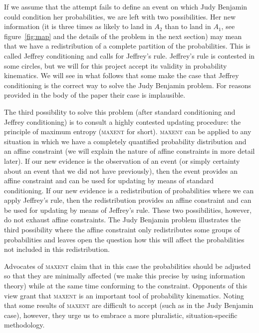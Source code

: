 \documentclass[smallextended]{svjour3}       %
\begin{document}
If we assume that the attempt fails to define an event on which Judy
Benjamin could condition her probabilities, we are left with two
possibilities. Her new information (it is three times as likely to
land in $A_{2}$ than to land in $A_{1}$, see figure~\ref{fig:map} and
the details of the problem in the next section) may mean that we have
a redistribution of a complete partition of the probabilities. This is
called Jeffrey conditioning and calls for Jeffrey's rule. Jeffrey's
rule is contested in some circles, but we will for this project accept
its validity in probability kinematics. We will see in what follows
that some make the case that Jeffrey conditioning is the correct way
to solve the Judy Benjamin problem. For reasons provided in the body
of the paper their case is implausible.

The third possibility to solve this problem (after standard
conditioning and Jeffrey conditioning) is to consult a highly
contested updating procedure: the principle of maximum entropy
(\textsc{maxent} for short). \textsc{maxent} can be applied to any
situation in which we have a completely quantified probability
distribution and an affine constraint (we will explain the nature of
affine constraints in more detail later). If our new evidence is the
observation of an event (or simply certainty about an event that we
did not have previously), then the event provides an affine constraint
and can be used for updating by means of standard conditioning. If our
new evidence is a redistribution of probabilities where we can apply
Jeffrey's rule, then the redistribution provides an affine constraint
and can be used for updating by means of Jeffrey's rule. These two
possibilities, however, do not exhaust affine constraints. The Judy
Benjamin problem illustrates the third possibility where the affine
constraint only redistributes some groups of probabilities and leaves
open the question how this will affect the probabilities not included
in this redistribution.

Advocates of \textsc{maxent} claim that in this case the probabilities
should be adjusted so that they are minimally affected (we make this
precise by using information theory) while at the same time conforming
to the constraint. Opponents of this view grant that \textsc{maxent} is
an important tool of probability kinematics. Noting that some results
of \textsc{maxent} are difficult to accept (such as in the Judy
Benjamin case), however, they urge us to embrace a more pluralistic,
situation-specific methodology.
\end{document}
